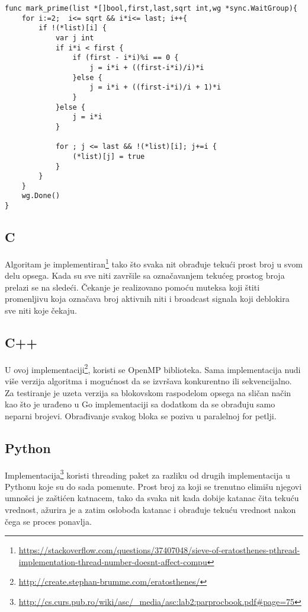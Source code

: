 \documentclass[12pt,oneside]{memoir}
\begin{document}
\begin{center}
\begin{lstlisting}[caption=Go implementacija konkurentne funkcije za označavanje prostih brojeva,label={lst:prime2},float, backgroundcolor=\color{background}]
func mark_prime(list *[]bool,first,last,sqrt int,wg *sync.WaitGroup){
	for i:=2;  i<= sqrt && i*i<= last; i++{
		if !(*list)[i] {
			var j int
			if i*i < first {
				if (first - i*i)%i == 0 {
					j = i*i + ((first-i*i)/i)*i
				}else {
					j = i*i + ((first-i*i)/i + 1)*i
				}
			}else {
				j = i*i
			}
		
			for ; j <= last && !(*list)[i]; j+=i {
				(*list)[j] = true
			}
		}
	}
	wg.Done()
}
\end{lstlisting}
\end{center}

\subsection{C}
Algoritam je implementiran\footnote{\url{https://stackoverflow.com/questions/37407048/sieve-of-eratosthenes-pthread-implementation-thread-number-doesnt-affect-compu}} tako što svaka nit obrađuje tekući prost broj u svom delu opsega. Kada su sve niti završile sa označavanjem tekućeg prostog broja prelazi se na sledeći. Čekanje je realizovano pomoću muteksa koji štiti promenljivu koja označava broj aktivnih niti i broadcast signala koji deblokira sve niti koje čekaju.

\subsection{C++}
U ovoj implementaciji\footnote{\url{http://create.stephan-brumme.com/eratosthenes/}}, koristi se OpenMP biblioteka. Sama implementacija nudi više verzija algoritma i mogućnost da se izvršava konkurentno ili sekvencijalno. Za testiranje je uzeta verzija sa blokovskom raspodelom opsega na sličan način kao što je urađeno u Go implementaciji sa dodatkom da se obrađuju samo neparni brojevi. Obrađivanje svakog bloka se poziva u paralelnoj for petlji.

\subsection{Python}
Implementacija\footnote{\url{http://cs.curs.pub.ro/wiki/asc/_media/asc:lab2:parprocbook.pdf\#page=75}} koristi threading paket za razliku od drugih implementacija u Pythonu koje su do sada pomenute. Prost broj za koji se trenutno elimišu njegovi umnošci je zaštićen katnacem, tako da svaka nit kada dobije katanac čita tekuću vrednost, ažurira je a zatim oslobođa katanac i obrađuje tekuću vrednost nakon čega se proces ponavlja. 
\end{document}
